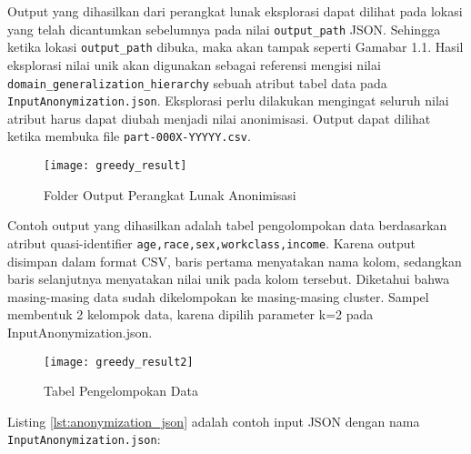 Output yang dihasilkan dari perangkat lunak eksplorasi dapat dilihat pada lokasi yang telah dicantumkan sebelumnya pada nilai \texttt{output\_path} JSON.  Sehingga ketika lokasi \texttt{output\_path} dibuka, maka akan tampak seperti Gamabar 1.1. Hasil eksplorasi nilai unik akan digunakan sebagai referensi mengisi nilai \texttt{domain\_generalization\_hierarchy} sebuah atribut tabel data pada \texttt{InputAnonymization.json}. Eksplorasi perlu dilakukan mengingat seluruh nilai atribut harus dapat diubah menjadi nilai anonimisasi. Output dapat dilihat ketika membuka file \texttt{part-000X-YYYYY.csv}.

\begin{figure}[H]
	\centering
	\texttt{[image: greedy\_result]}
	\caption{Folder Output Perangkat Lunak Anonimisasi}
	\label{fig:pertama2}
\end{figure}

Contoh output yang dihasilkan adalah tabel pengolompokan data berdasarkan atribut quasi-identifier \texttt{age,race,sex,workclass,income}. Karena output disimpan dalam format CSV, baris pertama menyatakan nama kolom, sedangkan baris selanjutnya menyatakan nilai unik pada kolom tersebut. Diketahui bahwa masing-masing data sudah dikelompokan ke masing-masing cluster. Sampel membentuk 2 kelompok data, karena dipilih parameter k=2 pada InputAnonymization.json.

\begin{figure}[H]
	\centering
	\texttt{[image: greedy\_result2]}
	\caption{Tabel Pengelompokan Data}
	\label{fig:pertama2}
\end{figure}

\newpage
\noindent Listing \ref{lst:anonymization_json} adalah contoh input JSON dengan nama \texttt{InputAnonymization.json}:

